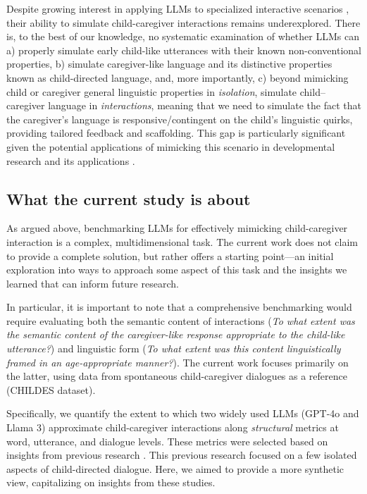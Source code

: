 Despite growing interest in applying LLMs to specialized interactive scenarios \citep{feng2024can, yang2024talk2care}, their ability to simulate child-caregiver interactions remains underexplored. There is, to the best of our knowledge, no systematic examination of whether LLMs can a) properly simulate early child-like utterances with their known non-conventional properties, b) simulate caregiver-like language and its distinctive properties known as child-directed language, and, more importantly, c) beyond mimicking child or caregiver general linguistic properties in \textit{isolation}, simulate child–caregiver language in \textit{interactions}, meaning that we need to simulate the fact that the caregiver's language is responsive/contingent on the child's linguistic quirks, providing tailored feedback and scaffolding. This gap is particularly significant given the potential applications of mimicking this scenario in developmental research and its applications \citep{zhang2024mathemyths, seo2024chacha, rasanen2024age,feng2024can}.

\subsection*{What the current study is about}

As argued above, benchmarking LLMs for effectively mimicking child-caregiver interaction is a complex, multidimensional task. The current work does not claim to provide a complete solution, but rather offers a starting point---an initial exploration into ways to approach some aspect of this task and the insights we learned that can inform future research. 

In particular, it is important to note that a comprehensive benchmarking would require evaluating both the semantic content of interactions (\textit{To what extent was the semantic content of the caregiver-like response appropriate to the child-like utterance?}) and linguistic form (\textit{To what extent was this content linguistically framed in an age-appropriate manner?}). The current work focuses primarily on the latter, using data from spontaneous child-caregiver dialogues as a reference (CHILDES dataset)\cite{macwhinney2000childes}.

Specifically, we quantify the extent to which two widely used LLMs (GPT-4o and Llama 3) approximate child-caregiver interactions along \textit{structural} metrics at word, utterance, and dialogue levels. These metrics were selected based on insights from previous research \citep{valentini2023automatic, rasanen2024age, french2024aligning}. This previous research focused on a few isolated aspects of child-directed dialogue. Here, we aimed to provide a more synthetic view, capitalizing on insights from these studies.

